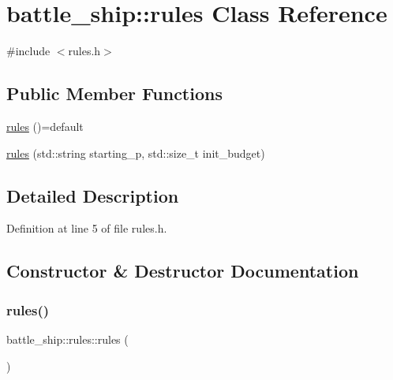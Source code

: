 \hypertarget{classbattle__ship_1_1rules}{}\section{battle\+\_\+ship\+:\+:rules Class Reference}
\label{classbattle__ship_1_1rules}


{\ttfamily \#include $<$rules.\+h$>$}

\subsection*{Public Member Functions}
\begin{DoxyCompactItemize}
\item 
\hyperlink{classbattle__ship_1_1rules_af6031ef32ef2509ffc22d611be19bf32}{rules} ()=default
\item 
\hyperlink{classbattle__ship_1_1rules_a3385bb490b9f69c7e2ccd4406f62c5d4}{rules} (std\+::string starting\+\_\+p, std\+::size\+\_\+t init\+\_\+budget)
\end{DoxyCompactItemize}


\subsection{Detailed Description}


Definition at line 5 of file rules.\+h.



\subsection{Constructor \& Destructor Documentation}
\mbox{\label{classbattle__ship_1_1rules_af6031ef32ef2509ffc22d611be19bf32}} 
\subsubsection{\texorpdfstring{rules()}{rules()}\hspace{0.1cm}{\footnotesize\ttfamily [1/2]}}
{\footnotesize\ttfamily battle\+\_\+ship\+::rules\+::rules (\begin{DoxyParamCaption}{ }\end{DoxyParamCaption})\hspace{0.3cm}{\ttfamily [default]}}

